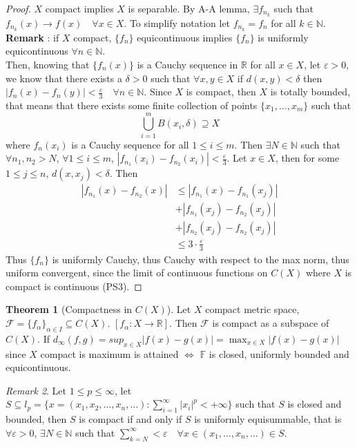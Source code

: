 \documentclass[13pt]{article}
\theoremstyle{definition} --- default
\newtheorem{theorem}{Theorem}
\theoremstyle{definition}
\theoremstyle{remark}
\newtheorem{remark}[theorem]{Remark}
\begin{document}
\begin{proof}
	$X$ compact implies $X$ is separable. By A-A lemma, $\exists f_{n_k}$ such that $f_{n_k}(x) \to f(x) \quad \forall x \in X$. To simplify notation let $f_{n_k} = f_n$ for all $k \in \mathbb{N}$. \textbf{Remark} : if $X$ compact, $\{f_n\}$ equicontinuous implies $\{f_n\}$ is uniformly equicontinuous $\forall n \in \mathbb{N}$. \\
	Then, knowing that $\{f_n(x)\}$ is a Cauchy sequence in $\mathbb{R}$ for all $x \in X$, let $\varepsilon > 0 $, we know that there exists a $\delta > 0$ such that $\forall x,y \in X$ if $d(x,y) < \delta$ then $|f_n(x) - f_n(y)| < \frac{\varepsilon}{3} \quad \forall n \in \mathbb{N}$. Since $X$ is compact, then $X$ is totally bounded, that means that there exists some finite collection of points $\{x_1,\ldots,x_m\}$ such that 
	$$\bigcup_{i=1}^m B(x_i,\delta) \supseteq X$$
	where $f_n(x_i)$ is a Cauchy sequence for all $1 \leq i \leq m$. Then $\exists N \in \mathbb{N}$ such that $\forall n_1, n_2 >N$, $\forall 1 \leq i \leq m$, $|f_{n_1}(x_i) - f_{n_2}(x_i)| < \frac{\varepsilon}{3}$. Let $x \in X$, then for some $1 \leq j \leq n$, $d(x,x_j) < \delta$. Then 
	\begin{align*}
	|f_{n_1}(x) - f_{n_2}(x)|  &\leq |f_{n_1}(x) - f_{n_1}(x_j)| \\
	&+ |f_{n_1}(x_j) - f_{n_2}(x_j)| \\
	&+ |f_{n_2}(x_j) - f_{n_2}(x_j)| \\
	&\leq 3 \cdot \frac{\varepsilon}{3}
	\end{align*}	
	Thus $\{f_n\}$ is uniformly Cauchy, thus Cauchy with respect to the max norm, thus uniform convergent, since the limit of continuous functions on $C(X)$ where $X$ is compact is continuous (PS3).
	\end{proof}
	\begin{theorem}[Compactness in $C(X)$]
		Let $X$ compact metric space, $\mathcal{F} = \{f_\alpha\}_{\alpha \in I} \subseteq C(X)$. 
		$[f_{\alpha} \colon X \to \mathbb{R}]$. Then $\mathcal{F}$ is compact as a subspace of $C(X)$. If $d_\infty(f,g) = sup_{x \in X} |f(x) - g(x)| = \max_{x \in X} |f(x) - g(x)|$ since $X$ compact is maximum is attained $\iff$ $\mathbb{F}$ is closed, uniformly bounded and equicontinuous.
	\end{theorem}

	\begin{remark}
		Let $1 \leq p \leq \infty$, let $S \subseteq l_p = \{x = (x_1,x_2,\ldots,x_n,\ldots) \colon \sum_{i=1}^\infty |x_i|^p < +\infty\}$ such that $S$ is closed and bounded, then $S$ is compact if and only if $S$ is uniformly equisummable, that is $\forall \varepsilon >0$, $\exists N \in \mathbb{N}$ such that $\sum_{k=N}^\infty < \varepsilon \quad \forall x \in (x_1,\ldots,x_n,\ldots) \in S$.
	\end{remark}
\end{document}
